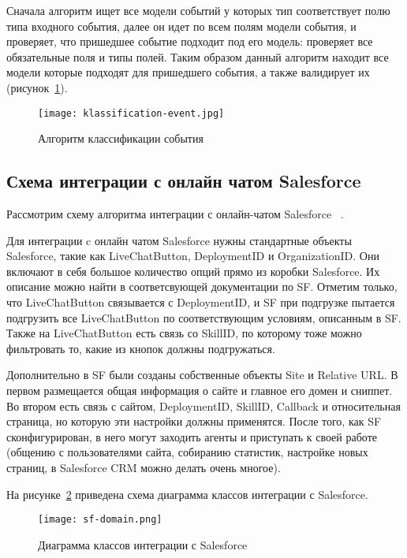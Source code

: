 Сначала алгоритм ищет все модели событий у которых тип соответствует полю типа входного события, далее он идет по всем полям модели события, и проверяет, что пришедшее событие подходит под его модель: проверяет все обязательные поля и типы полей. Таким образом данный алгоритм находит все модели которые подходят для пришедшего события, а также валидирует их (рисунок~\ref{fig:klassification-event}).


\pagebreak
\begin{figure}[h]
\centering
  \texttt{[image: klassification-event.jpg]}  
  \caption{Алгоритм классификации события}
  \label{fig:klassification-event}
\end{figure} 



\subsection{Схема интеграции с онлайн чатом Salesforce}
\label{sub:development:chat}
Рассмотрим схему алгоритма интеграции с онлайн-чатом Salesforce ~\cite{live_agent}. 

Для интеграции c онлайн чатом Salesforce нужны стандартные объекты Salesforce, такие как LiveChatButton, DeploymentID и OrganizationID. Они включают в себя большое количество опций прямо из коробки Salesforce. Их описание можно найти в соответсвующей документации по SF. Отметим только, что LiveChatButton связывается с DeploymentID, и SF при подгрузке пытается подгрузить все LiveChatButton по соответствующим условиям, описанным в SF. Также на LiveChatButton есть связь со SkillID, по которому тоже можно фильтровать то, какие из кнопок должны подгружаться.

Дополнительно в SF были созданы собственные объекты Site и Relative URL. В первом размещается общая информация о сайте и главное его домен и сниппет. Во втором есть связь с сайтом, DeploymentID, SkillID, Callback и относительная страница, но которую эти настройки должны применятся. После того, как SF сконфигурирован, в него могут заходить агенты и приступать к своей работе (общению с пользователями сайта, собиранию статистик, настройке новых страниц, в Salesforce CRM можно делать очень многое). 

На рисунке~\ref{fig:sf-domain} приведена схема диаграмма классов интеграции с Salesforce.

\begin{figure}[h]
\centering
  \texttt{[image: sf-domain.png]}  
  \caption{Диаграмма классов интеграции с Salesforce}
  \label{fig:sf-domain}
\end{figure} 

